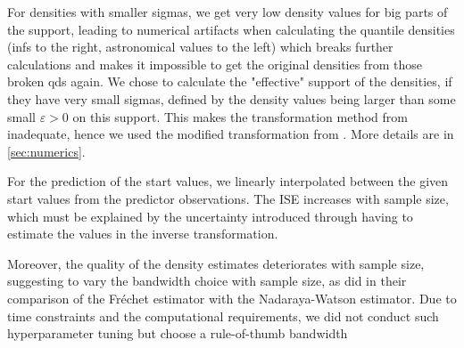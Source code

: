 For densities with smaller sigmas, we get very low density values for big parts of the
support, leading to numerical artifacts when calculating the quantile densities (infs
to the right, astronomical values to the left) which breaks further calculations and
makes it impossible to get the original densities from those broken qds again. We chose
to calculate the "effective" support of the densities, if they have very small sigmas,
defined by the density values being larger than some small $\varepsilon > 0$ on this support. This
makes the transformation method from \textcite{PetersenMüller2016} inadequate, hence we
used the modified transformation from \textcite{KokoszkaEtAl2019}. More details are in
\ref{sec:numerics}.

For the prediction of the start values, we linearly interpolated between the given start
values from the predictor observations. The ISE increases with sample size, which must
be explained by the uncertainty introduced through having to estimate the values in the
inverse transformation.

Moreover, the quality of the density estimates deteriorates with sample size, suggesting
to vary the bandwidth choice with sample size, as \textcite{PetersenMüller2019} did in
their comparison of the Fréchet estimator with the Nadaraya-Watson estimator. Due to
time constraints and the computational requirements, we did not conduct such
hyperparameter tuning but choose a rule-of-thumb bandwidth
\parencites[Chapter~3.4.1]{Silverman1986}[Chapter~2.2.1]{LiRacine2007}
